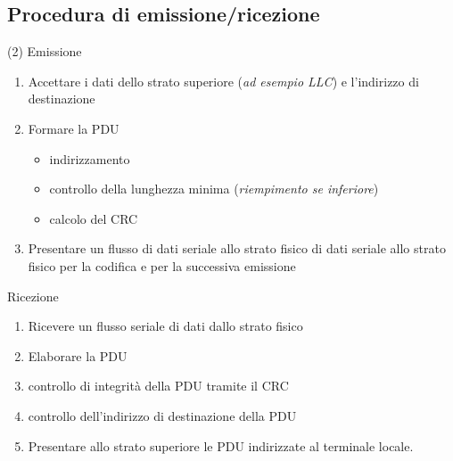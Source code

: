 \documentclass{book}
\begin{document}
\subsection{Procedura di emissione/ricezione}
\begin{tasks}(2)
	\task Emissione
	\begin{enumerate}
		\item Accettare i dati dello strato superiore (\textit{ad esempio LLC})
			e l'indirizzo di destinazione
		\item Formare la PDU
			\begin{itemize}
				\item indirizzamento
				\item controllo della lunghezza minima (\textit{riempimento se
					inferiore})
				\item calcolo del CRC
			\end{itemize}
		\item Presentare un flusso di dati seriale allo strato fisico di dati
			seriale allo strato fisico per la codifica e per la successiva
			emissione
	\end{enumerate}
	\task Ricezione
	\begin{enumerate}
		\item Ricevere un flusso seriale di dati dallo strato fisico
		\item Elaborare la PDU
		\item controllo di integrità della PDU tramite il CRC
		\item controllo dell'indirizzo di destinazione della PDU
		\item Presentare allo strato superiore le PDU indirizzate al terminale
			locale.
	\end{enumerate}
\end{tasks}
\end{document}
